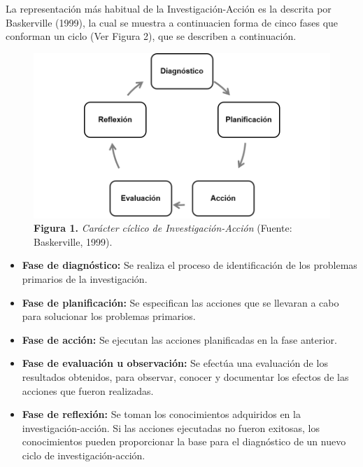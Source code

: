 	La representaci\'{o}n m\'{a}s habitual de la Investigaci\'{o}n-Acci\'{o}n es la descrita por Baskerville (1999), la cual se muestra a continuacien forma de cinco fases que conforman un ciclo (Ver Figura 2), que se describen a continuaci\'{o}n.
	\FloatBarrier %
	\begin{figure}
		\centering
		\includegraphics[scale=0.77]{img/investigacion-accion.png}
			\caption{\textbf{Figura 1.} \textit{Car\'{a}cter c\'{i}clico de Investigaci\'{o}n-Acci\'{o}n} (Fuente: Baskerville, 1999).}
	\end{figure}
	\FloatBarrier %
	\begin{itemize}
		\item \textbf{Fase de diagn\'{o}stico:} Se realiza el proceso de identificaci\'{o}n de los problemas primarios de la investigaci\'{o}n.
		\item \textbf{Fase de planificaci\'{o}n:} Se especifican las acciones que se llevaran a cabo para solucionar los problemas primarios.
		\item \textbf{Fase de acci\'{o}n:} Se ejecutan las acciones planificadas en la fase anterior.
		\item \textbf{Fase de evaluaci\'{o}n u observaci\'{o}n:} Se efect\'{u}a una evaluaci\'{o}n de los resultados obtenidos, para observar, conocer y documentar los efectos de las acciones que fueron realizadas.
		\item \textbf{Fase de reflexi\'{o}n:} Se toman los conocimientos adquiridos en la investigaci\'{o}n-acci\'{o}n. Si las acciones ejecutadas no fueron exitosas, los conocimientos pueden proporcionar la base para el diagn\'{o}stico de un nuevo ciclo de investigaci\'{o}n-acci\'{o}n.
	\end{itemize}

